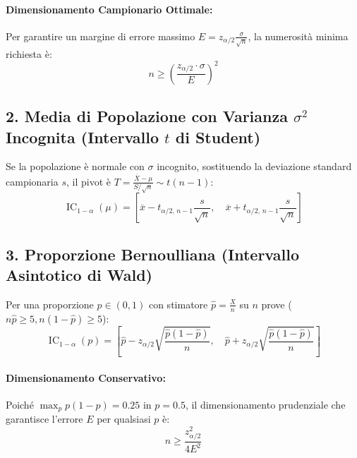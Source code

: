 \paragraph{Dimensionamento Campionario Ottimale:} Per garantire un margine di errore massimo $E = z_{\alpha/2}\frac{\sigma}{\sqrt{n}}$, la numerosità minima richiesta è:
\begin{equation}
    n \ge \left( \frac{z_{\alpha/2} \cdot \sigma}{E} \right)^2
\end{equation}

\subsection{2. Media di Popolazione con Varianza $\sigma^2$ Incognita (Intervallo $t$ di Student)}
Se la popolazione è normale con $\sigma$ incognito, sostituendo la deviazione standard campionaria $s$, il pivot è $T = \frac{\overline{X} - \mu}{S / \sqrt{n}} \sim t(n-1)$:
\begin{equation}
    \operatorname{IC}_{1-\alpha}(\mu) = \left[ \overline{x} - t_{\alpha/2, \, n-1}\frac{s}{\sqrt{n}}, \quad \overline{x} + t_{\alpha/2, \, n-1}\frac{s}{\sqrt{n}} \right]
\end{equation}

\subsection{3. Proporzione Bernoulliana (Intervallo Asintotico di Wald)}
Per una proporzione $p \in (0, 1)$ con stimatore $\widehat{p} = \frac{X}{n}$ su $n$ prove ($n\widehat{p} \ge 5, n(1-\widehat{p}) \ge 5$):
\begin{equation}
    \operatorname{IC}_{1-\alpha}(p) = \left[ \widehat{p} - z_{\alpha/2}\sqrt{\frac{\widehat{p}(1-\widehat{p})}{n}}, \quad \widehat{p} + z_{\alpha/2}\sqrt{\frac{\widehat{p}(1-\widehat{p})}{n}} \right]
\end{equation}
\paragraph{Dimensionamento Conservativo:} Poiché $\max_{p} p(1-p) = 0.25$ in $p=0.5$, il dimensionamento prudenziale che garantisce l'errore $E$ per qualsiasi $p$ è:
\begin{equation}
    n \ge \frac{z_{\alpha/2}^2}{4 E^2}
\end{equation}

